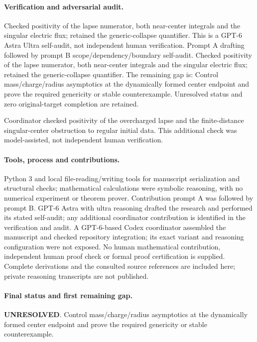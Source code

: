 \documentclass[11pt]{article}
\begin{document}
\paragraph{Verification and adversarial audit.}
Checked positivity of the lapse numerator, both near-center integrals and the singular electric flux; retained the generic-collapse quantifier. This is a GPT-6 Astra Ultra self-audit, not independent human verification. Prompt A drafting followed by prompt B scope/dependency/boundary self-audit. Checked positivity of the lapse numerator, both near-center integrals and the singular electric flux; retained the generic-collapse quantifier. The remaining gap is: Control mass/charge/radius asymptotics at the dynamically formed center endpoint and prove the required genericity or stable counterexample. Unresolved status and zero original-target completion are retained.

Coordinator checked positivity of the overcharged lapse and the finite-distance singular-center obstruction to regular initial data. This additional check was model-assisted, not independent human verification.

\paragraph{Tools, process and contributions.}
Python 3 and local file-reading/writing tools for manuscript serialization and structural checks; mathematical calculations were symbolic reasoning, with no numerical experiment or theorem prover. Contribution prompt A was followed by prompt B. GPT-6 Astra with ultra reasoning drafted the research and performed its stated self-audit; any additional coordinator contribution is identified in the verification and audit. A GPT-6-based Codex coordinator assembled the manuscript and checked repository integration; its exact variant and reasoning configuration were not exposed. No human mathematical contribution, independent human proof check or formal proof certification is supplied. Complete derivations and the consulted source references are included here; private reasoning transcripts are not published.

\paragraph{Final status and first remaining gap.}
\textbf{UNRESOLVED}. Control mass/charge/radius asymptotics at the dynamically formed center endpoint and prove the required genericity or stable counterexample.
\end{document}
